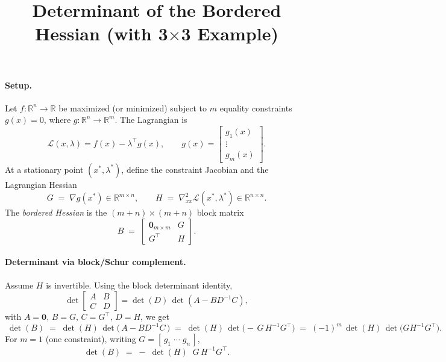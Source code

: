 \documentclass[12pt]{article}
\begin{document}
\title{Determinant of the Bordered Hessian (with 3$\times$3 Example)}
\author{}
\date{}
\maketitle

\paragraph{Setup.}
Let \(f:\mathbb{R}^n\to\mathbb{R}\) be maximized (or minimized) subject to \(m\) equality constraints \(g(x)=0\), where \(g:\mathbb{R}^n\to\mathbb{R}^m\).
The Lagrangian is
\[
\mathcal{L}(x,\lambda)=f(x)-\lambda^\top g(x), \qquad
g(x)=\begin{bmatrix}g_1(x)\\ \vdots \\ g_m(x)\end{bmatrix}.
\]
At a stationary point \((x^\ast,\lambda^\ast)\), define the constraint Jacobian and the Lagrangian Hessian
\[
G \;=\; \nabla g(x^\ast)\in\mathbb{R}^{m\times n},
\qquad
H \;=\; \nabla_{xx}^2 \mathcal{L}(x^\ast,\lambda^\ast)\in\mathbb{R}^{n\times n}.
\]
The \emph{bordered Hessian} is the \((m+n)\times(m+n)\) block matrix
\[
B \;=\;
\begin{bmatrix}
\mathbf{0}_{m\times m} & G\\
G^\top & H
\end{bmatrix}.
\]

\paragraph{Determinant via block/Schur complement.}
Assume \(H\) is invertible. Using the block determinant identity,
\[
\det\!\begin{bmatrix}A&B\\C&D\end{bmatrix}
=\det(D)\,\det(A-BD^{-1}C),
\]
with \(A=\mathbf{0},\,B=G,\,C=G^\top,\,D=H\), we get
\[
\boxed{\;
\det(B)\;=\;\det(H)\,\det\!\bigl(\,A-BD^{-1}C\,\bigr)
\;=\;\det(H)\,\det\!\bigl(-\,G\,H^{-1}G^\top\bigr)
\;=\;(-1)^m\,\det(H)\,\det\!\bigl(GH^{-1}G^\top\bigr).
\;}
\]
For \(m=1\) (one constraint), writing \(G=[\,g_1\;\cdots\;g_n\,]\),
\[
\boxed{\;\det(B)\;=\;-\;\det(H)\;\;G\,H^{-1}G^\top.\;}
\]
\end{document}
